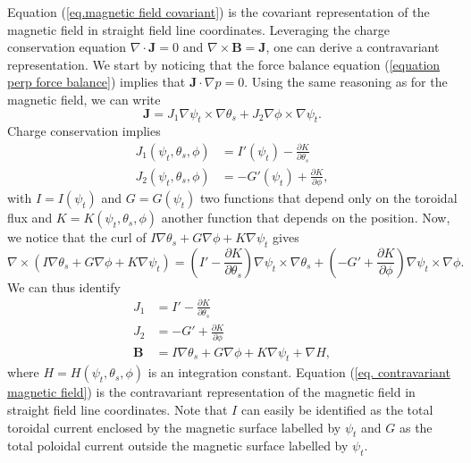 Equation (\ref{eq.magnetic field covariant}) is the covariant representation of the magnetic field in straight field line coordinates. Leveraging the charge conservation equation $\nabla\cdot\mathbf{J}=0$ and $\nabla\times\mathbf{B}=\mathbf{J}$, one can derive a contravariant representation. We start by noticing that the force balance equation (\ref{equation perp force balance}) implies that $\mathbf{J}\cdot\nabla p =0$. Using the same reasoning as for the magnetic field, we can write
\begin{equation}
	\mathbf{J}=J_1\nabla\psi_t\times\nabla\theta_s + J_2\nabla\phi\times\nabla\psi_t.
\end{equation}
Charge conservation implies
\begin{align}
	J_1(\psi_t,\theta_s,\phi) &= I'(\psi_t) - \frac{\partial K}{\partial \theta_s}\\
	J_2(\psi_t,\theta_s,\phi) &= -G'(\psi_t) + \frac{\partial K}{\partial \phi},
\end{align}
with $I=I(\psi_t)$ and $G=G(\psi_t)$ two functions that depend only on the toroidal flux and $K=K(\psi_t,\theta_s,\phi)$ another function that depends on the position. Now, we notice that the curl of $I\nabla\theta_s + G\nabla\phi + K\nabla\psi_t$ gives
\begin{equation}
	\nabla\times(I\nabla\theta_s + G\nabla\phi + K\nabla\psi_t) = \left(I'-\frac{\partial K}{\partial \theta_s}\right) \nabla\psi_t\times\nabla\theta_s + \left(-G'+\frac{\partial K}{\partial \phi}\right) \nabla\psi_t\times\nabla\phi.
\end{equation}
We can thus identify
\begin{align}
	J_1 &= I'-\frac{\partial K}{\partial \theta_s}\\
	J_2 &= -G'+\frac{\partial K}{\partial \phi}\\
	\mathbf{B} &= I\nabla\theta_s + G\nabla\phi + K\nabla\psi_t + \nabla H, \label{eq. contravariant magnetic field}
\end{align}
where $H=H(\psi_t,\theta_s,\phi)$ is an integration constant. Equation (\ref{eq. contravariant magnetic field}) is the contravariant representation of the magnetic field in straight field line coordinates. Note that $I$ can easily be identified as the total toroidal current enclosed by the magnetic surface labelled by $\psi_t$ and $G$ as the total poloidal current outside the magnetic surface labelled by $\psi_t$.

